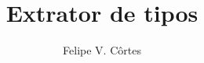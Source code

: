 \documentclass[mscr,american]{thesispuc}%
\author{Felipe V. Côrtes}
\title{Extrator de tipos} %
\begin{document}
  
  
  
  
  
  \arial
   
\end{document}
